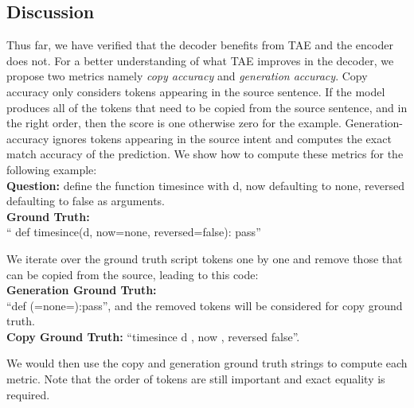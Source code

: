 \subsection{Discussion}
Thus far, we have verified that the decoder benefits from TAE and the encoder does not. For a better understanding of what TAE improves in the decoder, we propose two metrics namely \textit{copy accuracy} and \textit{generation accuracy}. Copy accuracy only considers tokens appearing in the source sentence. If the model produces all of the tokens that need to be copied from the source sentence, and in the right order, then the score is one otherwise zero for the example. Generation-accuracy ignores tokens appearing in the source intent and computes the exact match accuracy of the prediction. We show how to compute these metrics for the following example:
\\
\textbf{Question:} define the function timesince with d, now defaulting to none, reversed defaulting to false as arguments.
\\
\textbf{Ground Truth:}\\
``{\selectfont
def timesince(d, now=none, reversed=false): pass}''

We iterate over the ground truth script tokens one by one and remove those that can be copied from the source, leading to this code:\\
\textbf{Generation Ground Truth:} \\
``{\selectfont def (=none=):pass}'',
and the removed tokens will be considered for copy ground truth.\\
\textbf{Copy Ground Truth:} ``{\selectfont timesince d , now , reversed false}''.

We would then use the copy and generation ground truth strings to compute each metric. Note that the order of tokens are still important and exact equality is required.


